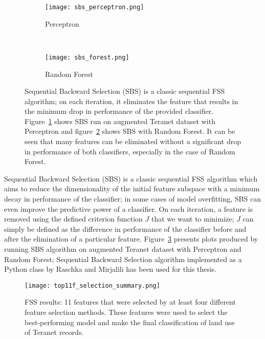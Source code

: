 \begin{figure}[hbt!]
    \centering
    \begin{subfigure}[t]{.45\textwidth}
        \centering
        \texttt{[image: sbs\_perceptron.png]}
        \caption{Perceptron}
        \label{fig:sbs_perceptron}
    \end{subfigure}
    ~ %
    \begin{subfigure}[t]{.53\textwidth}
        \centering
        \texttt{[image: sbs\_forest.png]}
        \caption{Random Forest}
        \label{fig:sbs_forest}
    \end{subfigure}
    \caption{Sequential Backward Selection (SBS) is a classic sequential FSS algorithm;
    on each iteration, it eliminates the feature that results in the minimum drop in performance of the provided classifier.
    Figure~\ref{fig:sbs_perceptron} shows SBS run on augmented Teranet dataset with Perceptron and figure~\ref{fig:sbs_forest} shows SBS with Random Forest.
    It can be seen that many features can be eliminated without a significant drop in performance of both classifiers, especially in the case of Random Forest.}
    \label{fig:sbs_teranet}
\end{figure}

Sequential Backward Selection (SBS) is a classic sequential FSS algorithm which aims to reduce the dimensionality of the initial feature subspace with a minimum decay in performance of the classifier;
in some cases of model overfitting, SBS can even improve the predictive power of a classifier.
On each iteration, a feature is removed using the defined criterion function $J$ that we want to minimize;
$J$ can simply be defined as the difference in performance of the classifier before and after the elimination of a particular feature.
Figure~\ref{fig:sbs_teranet} presents plots produced by running SBS algorithm on augmented Teranet dataset with Perceptron and Random Forest;
Sequential Backward Selection algorithm implemented as a Python class by Raschka and Mirjalili\cite{RaschkaMirjalili2017} has been used for this thesis.

\begin{figure}[hbt!]
    \centering
    \texttt{[image: top11f\_selection\_summary.png]}
    \caption{FSS results: 11 features that were selected by at least four different feature selection methods.
    These features were used to select the best-performing model and make the final classification of land use of Teranet records.}
    \label{fig:top_feats}
\end{figure}

